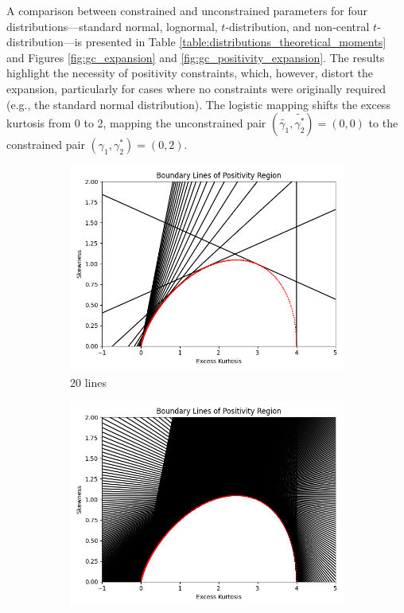 A comparison between constrained and unconstrained parameters for four distributions—standard normal, lognormal, $t$-distribution, and non-central $t$-distribution—is presented in Table \ref{table:distributions_theoretical_moments} and Figures \ref{fig:gc_expansion} and \ref{fig:gc_positivity_expansion}. The results highlight the necessity of positivity constraints, which, however, distort the expansion, particularly for cases where no constraints were originally required (e.g., the standard normal distribution). The logistic mapping shifts the excess kurtosis from 0 to 2, mapping the unconstrained pair $(\tilde{\gamma_1}, \tilde{\gamma_2^*}) = (0,0)$ to the constrained pair $(\gamma_1, \gamma_2^*) = (0,2)$.

\begin{figure}
    \centering
    \begin{subfigure}[b]{0.4\textwidth}
        \centering
        \includegraphics[width=\textwidth]{img/gc_positivity_boundary_lines_20.png}
        \caption{20 lines}
    \end{subfigure}
    \hfill
    \begin{subfigure}[b]{0.4\textwidth}
        \centering
        \includegraphics[width=\textwidth]{img/gc_positivity_boundary_lines_1000.png}

\end{subfigure}
\end{figure}
